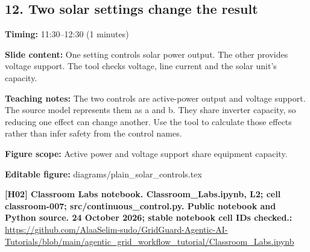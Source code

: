\documentclass[10pt,letterpaper]{article}
\begin{document}
\subsection*{12. Two solar settings change the result}
\textbf{Timing:} 11:30--12:30 (1 minutes)\par
\textbf{Slide content:} One setting controls solar power output. The other provides voltage support.
The tool checks voltage, line current and the solar unit's capacity.\par
\textbf{Teaching notes:} The two controls are active-power output and voltage support. The source model represents them as a and b. They share inverter capacity, so reducing one effect can change another. Use the tool to calculate those effects rather than infer safety from the control names.\par
\textbf{Figure scope:} Active power and voltage support share equipment capacity.\par
\textbf{Editable figure:} diagrams/plain\_solar\_controls.tex\par
\textbf{[H02] Classroom Labs notebook. Classroom\_Labs.ipynb, L2; cell classroom-007; src/continuous\_control.py. Public notebook and Python source. 24 October 2026; stable notebook cell IDs checked.:} \href{https://github.com/AlaaSelim-sudo/GridGuard-Agentic-AI-Tutorials/blob/main/agentic_grid_workflow_tutorial/Classroom_Labs.ipynb}{\small\ttfamily https:/\allowbreak{}/\allowbreak{}github.\allowbreak{}com/\allowbreak{}AlaaSelim-\allowbreak{}sudo/\allowbreak{}GridGuard-\allowbreak{}Agentic-\allowbreak{}AI-\allowbreak{}Tutorials/\allowbreak{}blob/\allowbreak{}main/\allowbreak{}agentic\_\allowbreak{}grid\_\allowbreak{}workflow\_\allowbreak{}tutorial/\allowbreak{}Classroom\_\allowbreak{}Labs.\allowbreak{}ipynb}\par
\par\medskip
\end{document}
